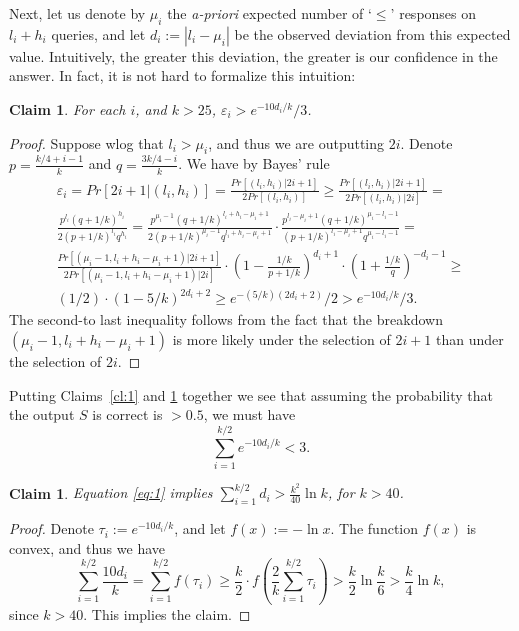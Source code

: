 \documentclass[12pt]{article}
\newtheorem{claim}[theorem]{Claim}
\newcommand{\ve}{\varepsilon}
\begin{document}
Next, let us denote by $\mu_i$ the {\em a-priori} expected number of `$\le$' responses on $l_i+h_i$ queries, and let $d_i:=|l_i-\mu_i|$ be
the observed deviation from this expected value. Intuitively, the greater this deviation, the greater is our confidence in the answer. 
In fact, it is not hard to formalize this intuition:

\begin{claim} \label{cl:2}
For each $i$, and $k>25$, $\ve_i> e^{-10 d_i/k}/3$. 
\end{claim}

\begin{proof}
Suppose wlog that $l_i>\mu_i$, and thus we are outputting $2i$. Denote $p=\frac{k/4+i-1}{k}$ and $q=\frac{3k/4-i}{k}$. We have by Bayes' rule
\begin{multline*}
\ve_i = Pr[2i+1|(l_i,h_i)] = \frac{Pr[(l_i,h_i)|2i+1]}{2Pr[(l_i,h_i)]} \ge \frac{  Pr[(l_i,h_i)|2i+1]}{2 Pr[(l_i,h_i)|2i]}= \\
\frac{p^{l_i} (q+1/k)^{h_i}}{2(p+1/k)^{l_i} q^{h_i}} = \frac{p^{\mu_i-1} (q+1/k)^{l_i+h_i-\mu_i+1}}{2(p+1/k)^{\mu_i-1} q^{l_i+h_i-\mu_i+1}}
\cdot \frac{p^{l_i-\mu_i+1} (q+1/k)^{\mu_i-l_i-1}}{(p+1/k)^{l_i-\mu_i+1} q^{\mu_i-l_i-1}} = \\
\frac{  Pr[(\mu_i-1,l_i+h_i-\mu_i+1)|2i+1]}{2 Pr[(\mu_i-1,l_i+h_i-\mu_i+1)|2i]} \cdot \left(1-\frac{1/k}{p+1/k}\right)^{d_i+1}\cdot \left(1+\frac{1/k}{q}\right)^{-d_i-1} \ge \\
(1/2)\cdot \left(1-5/k\right)^{2d_i+2} \ge e^{-(5/k)(2d_i+2)}/2 >  e^{-10 d_i/k}/3.
\end{multline*}
The second-to last inequality follows from the fact that the breakdown $(\mu_i-1,l_i+h_i-\mu_i+1)$ is more likely under the selection of $2i+1$ than under the selection of $2i$. 
\end{proof}

Putting Claims~\ref{cl:1} and \ref{cl:2} together we see that assuming the probability that the output $S$ is correct is $>0.5$, we must have
\begin{equation}\label{eq:1}
\sum_{i=1}^{k/2} e^{-10 d_i/k} < 3. 
\end{equation}

\begin{claim}\label{cl:3}
Equation \eqref{eq:1} implies $\sum_{i=1}^{k/2} d_i> \frac{k^2}{40} \ln k$, for $k>40$.  
\end{claim}

\begin{proof}
Denote $\tau_i:=e^{-10 d_i/k}$, and let $f(x):=-\ln x$. The function $f(x)$ is convex, and thus we have
$$
\sum_{i=1}^{k/2} \frac{10 d_i}{k} = \sum_{i=1}^{k/2} f(\tau_i) \ge \frac{k}{2} \cdot f\left(\frac{2}{k}\sum_{i=1}^{k/2} \tau_i\right) > \frac{k}{2} \ln \frac{k}{6}>\frac{k}{4}\ln k,
$$
since $k>40$. This implies the claim. 
\end{proof}
\end{document}
